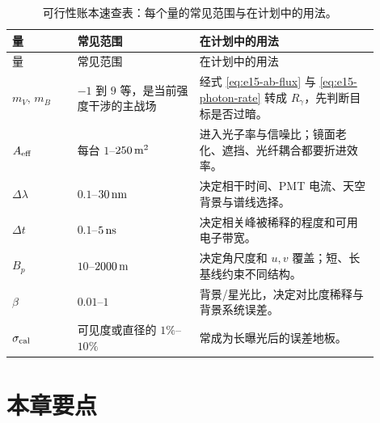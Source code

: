 \begin{longtable}{p{0.16\linewidth}p{0.30\linewidth}p{0.44\linewidth}}
\caption{可行性账本速查表：每个量的常见范围与在计划中的用法。}
\label{tab:e15-checklist}\\
\toprule
量 & 常见范围 & 在计划中的用法 \\
\midrule
\endfirsthead
\toprule
量 & 常见范围 & 在计划中的用法 \\
\midrule
\endhead
\(m_V,\,m_B\) & \(-1\) 到 \(9\) 等，是当前强度干涉的主战场 & 经式 \eqref{eq:e15-ab-flux} 与 \eqref{eq:e15-photon-rate} 转成 \(R_\gamma\)，先判断目标是否过暗。 \\
\(A_{\rm eff}\) & 每台 \(1\)--\(250\,{\rm m^2}\) & 进入光子率与信噪比；镜面老化、遮挡、光纤耦合都要折进效率。 \\
\(\Delta\lambda\) & \(0.1\)--\(30\,{\rm nm}\) & 决定相干时间、PMT 电流、天空背景与谱线选择。 \\
\(\Delta t\) & \(0.1\)--\(5\,{\rm ns}\) & 决定相关峰被稀释的程度和可用电子带宽。 \\
\(B_p\) & \(10\)--\(2000\,{\rm m}\) & 决定角尺度和 \(u,v\) 覆盖；短、长基线约束不同结构。 \\
\(\beta\) & \(0.01\)--\(1\) & 背景/星光比，决定对比度稀释与背景系统误差。 \\
\(\sigma_{\rm cal}\) & 可见度或直径的 \(1\%\)--\(10\%\) & 常成为长曝光后的误差地板。 \\
\bottomrule
\end{longtable}

\section{本章要点}
\label{sec:e15-summary}

